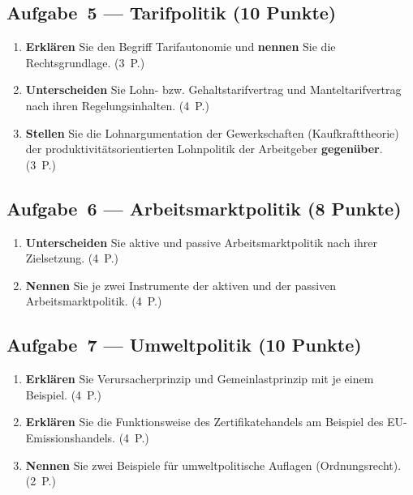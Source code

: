 \documentclass[11pt, a4paper]{article}
\begin{document}
\subsection*{Aufgabe~5 --- Tarifpolitik (10 Punkte)}

\begin{enumerate}[label=(\alph*)]
  \item \textbf{Erklären} Sie den Begriff Tarifautonomie und \textbf{nennen} Sie die
    Rechtsgrundlage. \hfill (3~P.)
  \item \textbf{Unterscheiden} Sie Lohn- bzw. Gehaltstarifvertrag und Manteltarifvertrag
    nach ihren Regelungsinhalten. \hfill (4~P.)
  \item \textbf{Stellen} Sie die Lohnargumentation der Gewerkschaften (Kaufkrafttheorie)
    der produktivitätsorientierten Lohnpolitik der Arbeitgeber \textbf{gegenüber}. \hfill (3~P.)
\end{enumerate}

\subsection*{Aufgabe~6 --- Arbeitsmarktpolitik (8 Punkte)}

\begin{enumerate}[label=(\alph*)]
  \item \textbf{Unterscheiden} Sie aktive und passive Arbeitsmarktpolitik nach ihrer
    Zielsetzung. \hfill (4~P.)
  \item \textbf{Nennen} Sie je zwei Instrumente der aktiven und der passiven
    Arbeitsmarktpolitik. \hfill (4~P.)
\end{enumerate}

\subsection*{Aufgabe~7 --- Umweltpolitik (10 Punkte)}

\begin{enumerate}[label=(\alph*)]
  \item \textbf{Erklären} Sie Verursacherprinzip und Gemeinlastprinzip mit je einem
    Beispiel. \hfill (4~P.)
  \item \textbf{Erklären} Sie die Funktionsweise des Zertifikatehandels am Beispiel des
    EU-Emissionshandels. \hfill (4~P.)
  \item \textbf{Nennen} Sie zwei Beispiele für umweltpolitische Auflagen (Ordnungsrecht).
    \hfill (2~P.)
\end{enumerate}
\end{document}
